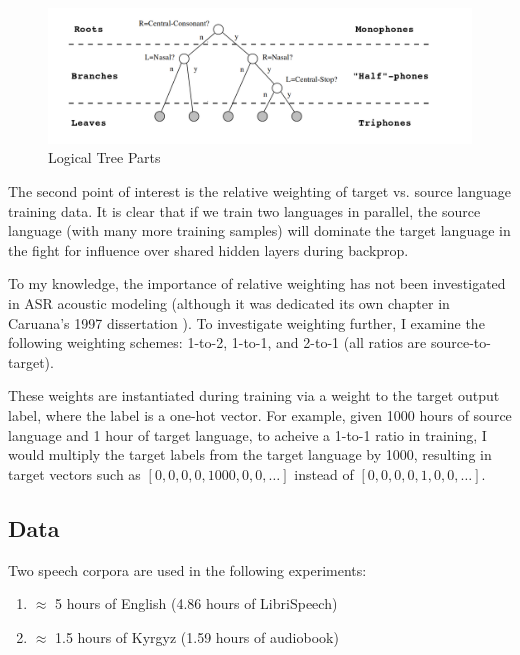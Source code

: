\documentclass[a4paper]{article}
\begin{document}
\begin{figure}[!htbp]
  \centering
{}
  \includegraphics[width=\linewidth]{figs-1/levels.png}
  \caption{Logical Tree Parts}
  \label{fig:tree-parts}
\endminipage\hfill
\end{figure}



The second point of interest is the relative weighting of target vs. source language training data. It is clear that if we train two languages in parallel, the source language (with many more training samples) will dominate the target language in the fight for influence over shared hidden layers during backprop.

To my knowledge, the importance of relative weighting has not been investigated in ASR acoustic modeling (although it was dedicated its own chapter in Caruana's 1997 dissertation \cite{caruana1997}). To investigate weighting further, I examine the following weighting schemes: 1-to-2, 1-to-1, and 2-to-1 (all ratios are source-to-target).

These weights are instantiated during training via a weight to the target output label, where the label is a one-hot vector. For example, given 1000 hours of source language and 1 hour of target language, to acheive a 1-to-1 ratio in training, I would multiply the target labels from the target language by 1000, resulting in target vectors such as \texttt{$[0, 0, 0, 0, 1000, 0, 0, \ldots]$} instead of \texttt{$[0, 0, 0, 0, 1, 0, 0, \ldots]$}.



\subsection{Data}

Two speech corpora are used in the following experiments:

\begin{enumerate}
\item $\approx$ 5 hours of English (4.86 hours of LibriSpeech)
\item $\approx$ 1.5 hours of Kyrgyz (1.59 hours of audiobook)
\end{enumerate}
\end{document}
